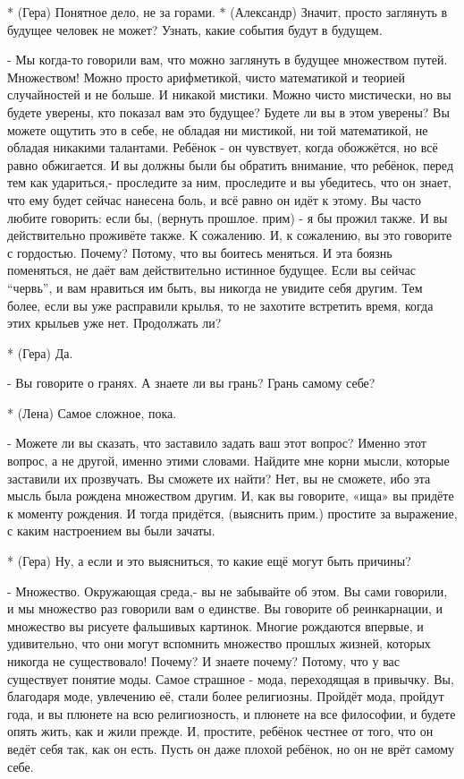 * (Гера) Понятное дело, не за горами.
* (Александр) Значит, просто заглянуть в будущее человек не может? Узнать, какие события будут в будущем.

- Мы когда-то говорили вам, что можно заглянуть в будущее множеством путей.  Множеством! Можно просто арифметикой, чисто математикой и теорией случайностей и не больше. И никакой мистики.  Можно чисто мистически, но вы будете уверены, кто показал вам это будущее? Будете ли вы в этом уверены? Вы можете ощутить это в себе, не обладая ни мистикой, ни той математикой, не обладая никакими талантами. Ребёнок - он чувствует, когда обожжётся, но всё равно обжигается. И вы должны были бы обратить внимание, что ребёнок, перед тем как удариться,- проследите за ним, проследите и вы убедитесь, что он знает, что ему будет сейчас нанесена боль, и всё равно он идёт к этому.  Вы часто любите говорить: если бы, (вернуть прошлое. прим) - я бы прожил также. И вы действительно проживёте также. К сожалению. И, к сожалению, вы это говорите с гордостью. Почему? Потому, что вы боитесь меняться.  И эта боязнь поменяться, не даёт вам действительно истинное будущее. Если вы сейчас “червь”, и вам нравиться им быть, вы никогда не увидите себя другим. Тем более, если вы уже расправили крылья, то не захотите встретить время, когда этих крыльев уже нет. Продолжать ли?

* (Гера) Да.

- Вы говорите о гранях. А знаете ли вы грань? Грань самому себе?

* (Лена) Самое сложное, пока.

- Можете ли вы сказать, что заставило задать ваш этот вопрос? Именно этот вопрос, а не другой, именно этими словами.  Найдите мне корни мысли, которые заставили их прозвучать. Вы сможете их найти? Нет, вы не сможете, ибо эта мысль была рождена множеством другим. И, как вы говорите, «ища» вы придёте к моменту рождения. И тогда придётся, (выяснить прим.) простите за выражение, с каким настроением вы были зачаты.

* (Гера) Ну, а если и это выясниться, то какие ещё могут быть причины?

- Множество. Окружающая среда,- вы не забывайте об этом.  Вы сами говорили, и мы множество раз говорили вам о единстве. Вы говорите об реинкарнации, и множество вы рисуете фальшивых картинок. Многие рождаются впервые, и удивительно, что они могут вспомнить множество прошлых жизней, которых никогда не существовало! Почему? И знаете почему? Потому, что у вас существует понятие моды. Самое страшное - мода, переходящая в привычку. Вы, благодаря моде, увлечению её, стали более религиозны. Пройдёт мода, пройдут года, и вы плюнете на всю религиозность, и плюнете на все философии, и будете опять жить, как и жили прежде. И, простите, ребёнок честнее от того, что он ведёт себя так, как он есть. Пусть он даже плохой ребёнок, но он не врёт самому себе.

